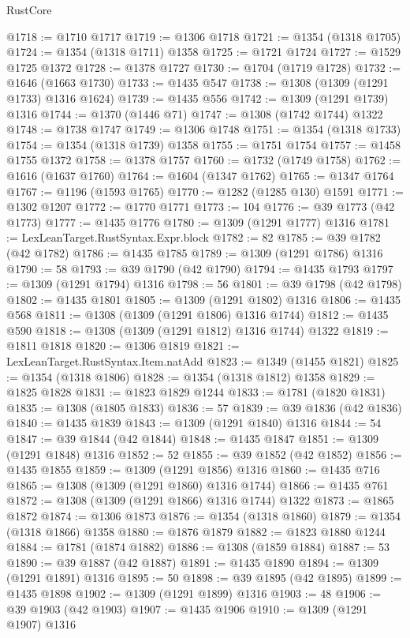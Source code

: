 \begin{lexlean}{RustCore}
\begin{coremodule}
@1718 := @1710 @1717
@1719 := @1306 @1718
@1721 := @1354 (@1318 @1705)
@1724 := @1354 (@1318 @1711) @1358
@1725 := @1721 @1724
@1727 := @1529 @1725 @1372
@1728 := @1378 @1727
@1730 := @1704 (@1719 @1728)
@1732 := @1646 (@1663 @1730)
@1733 := @1435 @547
@1738 := @1308 (@1309 (@1291 @1733) @1316 @1624)
@1739 := @1435 @556
@1742 := @1309 (@1291 @1739) @1316
@1744 := @1370 (@1446 @71)
@1747 := @1308 (@1742 @1744) @1322
@1748 := @1738 @1747
@1749 := @1306 @1748
@1751 := @1354 (@1318 @1733)
@1754 := @1354 (@1318 @1739) @1358
@1755 := @1751 @1754
@1757 := @1458 @1755 @1372
@1758 := @1378 @1757
@1760 := @1732 (@1749 @1758)
@1762 := @1616 (@1637 @1760)
@1764 := @1604 (@1347 @1762)
@1765 := @1347 @1764
@1767 := @1196 (@1593 @1765)
@1770 := @1282 (@1285 @130) @1591
@1771 := @1302 @1207
@1772 := @1770 @1771
@1773 := 104
@1776 := @39 @1773 (@42 @1773)
@1777 := @1435 @1776
@1780 := @1309 (@1291 @1777) @1316
@1781 := LexLeanTarget.RustSyntax.Expr.block
@1782 := 82
@1785 := @39 @1782 (@42 @1782)
@1786 := @1435 @1785
@1789 := @1309 (@1291 @1786) @1316
@1790 := 58
@1793 := @39 @1790 (@42 @1790)
@1794 := @1435 @1793
@1797 := @1309 (@1291 @1794) @1316
@1798 := 56
@1801 := @39 @1798 (@42 @1798)
@1802 := @1435 @1801
@1805 := @1309 (@1291 @1802) @1316
@1806 := @1435 @568
@1811 := @1308 (@1309 (@1291 @1806) @1316 @1744)
@1812 := @1435 @590
@1818 := @1308 (@1309 (@1291 @1812) @1316 @1744) @1322
@1819 := @1811 @1818
@1820 := @1306 @1819
@1821 := LexLeanTarget.RustSyntax.Item.natAdd
@1823 := @1349 (@1455 @1821)
@1825 := @1354 (@1318 @1806)
@1828 := @1354 (@1318 @1812) @1358
@1829 := @1825 @1828
@1831 := @1823 @1829 @1244
@1833 := @1781 (@1820 @1831)
@1835 := @1308 (@1805 @1833)
@1836 := 57
@1839 := @39 @1836 (@42 @1836)
@1840 := @1435 @1839
@1843 := @1309 (@1291 @1840) @1316
@1844 := 54
@1847 := @39 @1844 (@42 @1844)
@1848 := @1435 @1847
@1851 := @1309 (@1291 @1848) @1316
@1852 := 52
@1855 := @39 @1852 (@42 @1852)
@1856 := @1435 @1855
@1859 := @1309 (@1291 @1856) @1316
@1860 := @1435 @716
@1865 := @1308 (@1309 (@1291 @1860) @1316 @1744)
@1866 := @1435 @761
@1872 := @1308 (@1309 (@1291 @1866) @1316 @1744) @1322
@1873 := @1865 @1872
@1874 := @1306 @1873
@1876 := @1354 (@1318 @1860)
@1879 := @1354 (@1318 @1866) @1358
@1880 := @1876 @1879
@1882 := @1823 @1880 @1244
@1884 := @1781 (@1874 @1882)
@1886 := @1308 (@1859 @1884)
@1887 := 53
@1890 := @39 @1887 (@42 @1887)
@1891 := @1435 @1890
@1894 := @1309 (@1291 @1891) @1316
@1895 := 50
@1898 := @39 @1895 (@42 @1895)
@1899 := @1435 @1898
@1902 := @1309 (@1291 @1899) @1316
@1903 := 48
@1906 := @39 @1903 (@42 @1903)
@1907 := @1435 @1906
@1910 := @1309 (@1291 @1907) @1316

\end{coremodule}
\end{lexlean}
